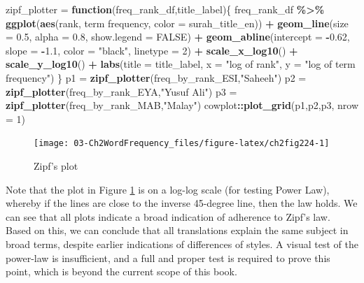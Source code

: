 \documentclass[
]{article}
\newenvironment{Shaded}{\begin{snugshade}}{\end{snugshade}}
\newcommand{\AttributeTok}[1]{\textcolor[rgb]{0.13,0.29,0.53}{#1}}
\newcommand{\ConstantTok}[1]{\textcolor[rgb]{0.56,0.35,0.01}{#1}}
\newcommand{\ControlFlowTok}[1]{\textcolor[rgb]{0.13,0.29,0.53}{\textbf{#1}}}
\newcommand{\DecValTok}[1]{\textcolor[rgb]{0.00,0.00,0.81}{#1}}
\newcommand{\FloatTok}[1]{\textcolor[rgb]{0.00,0.00,0.81}{#1}}
\newcommand{\FunctionTok}[1]{\textcolor[rgb]{0.13,0.29,0.53}{\textbf{#1}}}
\newcommand{\NormalTok}[1]{#1}
\newcommand{\OtherTok}[1]{\textcolor[rgb]{0.56,0.35,0.01}{#1}}
\newcommand{\SpecialCharTok}[1]{\textcolor[rgb]{0.81,0.36,0.00}{\textbf{#1}}}
\newcommand{\StringTok}[1]{\textcolor[rgb]{0.31,0.60,0.02}{#1}}
\begin{document}
\begin{Shaded}
\begin{Highlighting}[]
\NormalTok{zipf\_plotter }\OtherTok{=} \ControlFlowTok{function}\NormalTok{(freq\_rank\_df,title\_label)\{}
\NormalTok{  freq\_rank\_df }\SpecialCharTok{\%\textgreater{}\%} 
  \FunctionTok{ggplot}\NormalTok{(}\FunctionTok{aes}\NormalTok{(rank, }\StringTok{\textasciigrave{}}\AttributeTok{term frequency}\StringTok{\textasciigrave{}}\NormalTok{, }\AttributeTok{color =}\NormalTok{ surah\_title\_en)) }\SpecialCharTok{+} 
  \FunctionTok{geom\_line}\NormalTok{(}\AttributeTok{size =} \FloatTok{0.5}\NormalTok{, }\AttributeTok{alpha =} \FloatTok{0.8}\NormalTok{, }\AttributeTok{show.legend =} \ConstantTok{FALSE}\NormalTok{) }\SpecialCharTok{+} 
  \FunctionTok{geom\_abline}\NormalTok{(}\AttributeTok{intercept =} \SpecialCharTok{{-}}\FloatTok{0.62}\NormalTok{, }\AttributeTok{slope =} \SpecialCharTok{{-}}\FloatTok{1.1}\NormalTok{, }
              \AttributeTok{color =} \StringTok{"black"}\NormalTok{, }\AttributeTok{linetype =} \DecValTok{2}\NormalTok{) }\SpecialCharTok{+}
  \FunctionTok{scale\_x\_log10}\NormalTok{() }\SpecialCharTok{+}
  \FunctionTok{scale\_y\_log10}\NormalTok{() }\SpecialCharTok{+} 
  \FunctionTok{labs}\NormalTok{(}\AttributeTok{title =}\NormalTok{ title\_label, }
       \AttributeTok{x =} \StringTok{"log of rank"}\NormalTok{, }
       \AttributeTok{y =} \StringTok{"log of term frequency"}\NormalTok{)}
\NormalTok{\}}
\NormalTok{p1 }\OtherTok{=} \FunctionTok{zipf\_plotter}\NormalTok{(freq\_by\_rank\_ESI,}\StringTok{"Saheeh"}\NormalTok{)}
\NormalTok{p2 }\OtherTok{=} \FunctionTok{zipf\_plotter}\NormalTok{(freq\_by\_rank\_EYA,}\StringTok{"Yusuf Ali"}\NormalTok{)}
\NormalTok{p3 }\OtherTok{=} \FunctionTok{zipf\_plotter}\NormalTok{(freq\_by\_rank\_MAB,}\StringTok{"Malay"}\NormalTok{)}
\NormalTok{cowplot}\SpecialCharTok{::}\FunctionTok{plot\_grid}\NormalTok{(p1,p2,p3, }\AttributeTok{nrow =} \DecValTok{1}\NormalTok{)}
\end{Highlighting}
\end{Shaded}

\begin{figure}

{\centering \texttt{[image: 03-Ch2WordFrequency\_files/figure-latex/ch2fig224-1]} 

}

\caption{Zipf's plot}\label{fig:ch2fig224}
\end{figure}

Note that the plot in Figure \ref{fig:ch2fig224} is on a log-log scale (for testing Power Law), whereby if the lines are close to the inverse 45-degree line, then the law holds. We can see that all plots indicate a broad indication of adherence to Zipf's law. Based on this, we can conclude that all translations explain the same subject in broad terms, despite earlier indications of differences of styles. A visual test of the power-law is insufficient, and a full and proper test is required to prove this point, which is beyond the current scope of this book.
\end{document}
